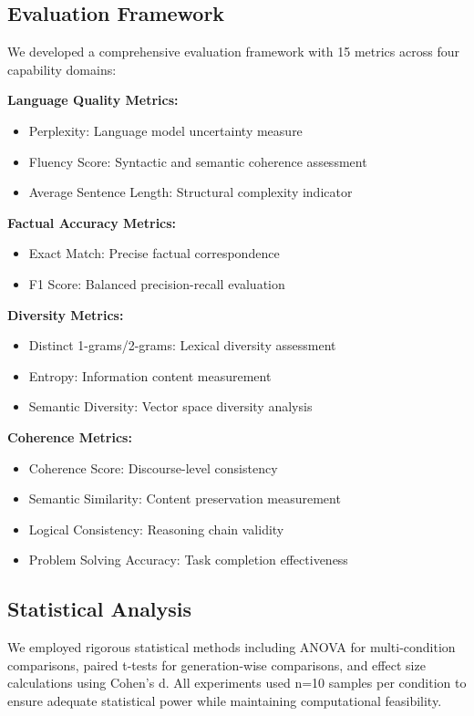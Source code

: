 \documentclass{article}
\begin{document}
\subsection{Evaluation Framework}

We developed a comprehensive evaluation framework with 15 metrics across four capability domains:

\textbf{Language Quality Metrics:}
\begin{itemize}
\item Perplexity: Language model uncertainty measure
\item Fluency Score: Syntactic and semantic coherence assessment
\item Average Sentence Length: Structural complexity indicator
\end{itemize}

\textbf{Factual Accuracy Metrics:}
\begin{itemize}
\item Exact Match: Precise factual correspondence
\item F1 Score: Balanced precision-recall evaluation
\end{itemize}

\textbf{Diversity Metrics:}
\begin{itemize}
\item Distinct 1-grams/2-grams: Lexical diversity assessment
\item Entropy: Information content measurement
\item Semantic Diversity: Vector space diversity analysis
\end{itemize}

\textbf{Coherence Metrics:}
\begin{itemize}
\item Coherence Score: Discourse-level consistency
\item Semantic Similarity: Content preservation measurement
\item Logical Consistency: Reasoning chain validity
\item Problem Solving Accuracy: Task completion effectiveness
\end{itemize}

\subsection{Statistical Analysis}

We employed rigorous statistical methods including ANOVA for multi-condition comparisons, paired t-tests for generation-wise comparisons, and effect size calculations using Cohen's d. All experiments used n=10 samples per condition to ensure adequate statistical power while maintaining computational feasibility.
\end{document}
